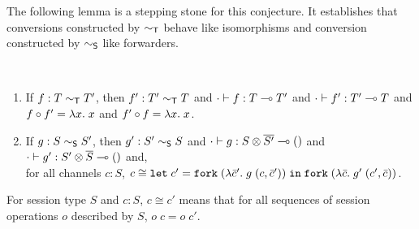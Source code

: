 The following lemma is a stepping stone for this conjecture. It
establishes that conversions constructed by $\eqt$ behave like
isomorphisms and conversion constructed by $\eqs$ like forwarders.
\begin{conjecture}[Conversions]~\\[-\baselineskip]
  \label{lemma:conversion}
  \begin{enumerate}
  \item If $f : T \eqt T'$,
    then $f' : T' \eqt T$
    and $\typing[\CNil]{f}{\TFun T{T'}}$
    and  $\typing[\CNil]{f'}{\TFun {T'}T}$
    and  $f \circ f' = \ELam x x$
    and  $f' \circ f = \ELam x x$.
  \item If $g : S \eqs S'$,
    then $g' : S' \eqs S$
    and $\typing[\CNil]{g}{\TFun {\TPair {S} {\TDual{S'}}} \TUnit}$
    and $\typing[\CNil]{g'}{\TFun {\TPair {S'} {\TDual{S}}} \TUnit}$
    and,\\
    for all channels $c : S$,  $c \cong \ELet{c'}{\EFork{( \ELam {\bar c'} g \; (c, \bar c')) }}{\EFork{( \ELam {\bar c} g' \; (c', \bar c)) }} $.
  \end{enumerate}
\end{conjecture}
For session type $S$ and $c:S$, $c \cong c'$ means that for all
sequences of session operations $o$ described by $S$, $o\; c = o\; c'$.


